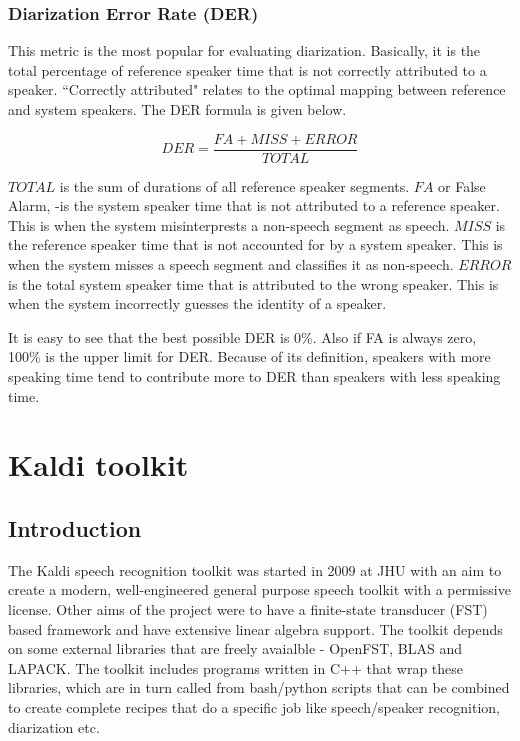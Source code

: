 	\subsubsection{Diarization Error Rate (DER)}
		This metric is the most popular for evaluating diarization. Basically, it is the total percentage of reference speaker time that is not correctly attributed to a speaker. ``Correctly attributed" relates to the optimal mapping between reference and system speakers. The DER formula is given below.
		
		$$ DER = \frac{FA + MISS + ERROR}{TOTAL} $$
		
		$TOTAL$ is the sum of durations of all reference speaker segments.
		$FA$ or False Alarm, -is the system speaker time that is not attributed to a reference speaker. This is when the system misinterprests a non-speech segment as speech.
		$MISS$ is the reference speaker time that is not accounted for by a system speaker. This is when the system misses a speech segment and classifies it as non-speech.
		$ERROR$ is the total system speaker time that is attributed to the wrong speaker. This is when the system incorrectly guesses the identity of a speaker.
		
		It is easy to see that the best possible DER is 0\%. Also if FA is always zero, 100\% is the upper limit for DER. Because of its definition, speakers with more speaking time tend to contribute more to DER than speakers with less speaking time.

\section{Kaldi toolkit}
	\subsection{Introduction}
	The Kaldi speech recognition toolkit \cite{povey2011kaldi} was started in 2009 at JHU with an aim to create a modern, well-engineered general purpose speech toolkit with a permissive license. Other aims of the project were to have a finite-state transducer (FST) based framework and have extensive linear algebra support. The toolkit depends on some external libraries that are freely avaialble - OpenFST, BLAS and LAPACK. The toolkit includes programs written in C++ that wrap these libraries, which are in turn called from bash/python scripts that can be combined to create complete recipes that do a specific job like speech/speaker recognition, diarization etc.
	

